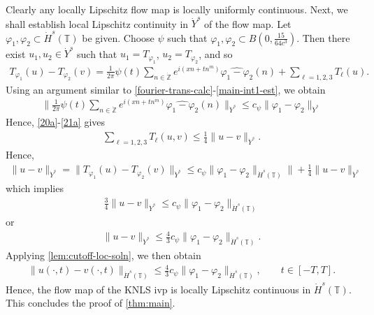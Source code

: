 \documentclass[12pt,reqno]{amsart}
\numberwithin{equation}{section}  %
\numberwithin{figure}{section}
\newcommand{\zz}{\mathbb{Z}}
\newcommand{\ci}{\mathbb{T}}
\newcommand{\zzdot}{\dot{\zz}}
\newcommand{\wh}{\widehat}
\newcommand{\vp}{\varphi}
\theoremstyle{plain}
\theoremstyle{definition}
\theoremstyle{remark}
\begin{document}
%
%
Clearly any locally Lipschitz flow map is locally uniformly continuous. 
Next, we shall establish local Lipschitz continuity in $\dot{Y}^s$ of the flow
map. Let $\vp_1, \vp_2 \subset \dot{H}^s(\ci)$ be given. Choose $\psi$ such that
$\vp_1, \vp_2 \subset B(0, \frac{15}{64c^{3}})$.  Then there exist $u_1, u_2 \in
\dot{Y}^s$ such that $u_1 = T_{\vp_1}$, $u_2 = T_{\vp_2}$, and so
%
%
\begin{equation*}
	\begin{split}
		T_{\vp_1}(u) - T_{\vp_2}(v) = \frac{1}{2\pi} \psi(t) \sum_{n \in
		\zzdot}e^{i\left( xn + tn^{m} \right)} \wh{\vp_1 - \vp_2}(n) + \sum_{\ell
		= 1,2,3} T_{\ell}(u).
	\end{split}
\end{equation*}
%
%
Using an argument similar to \eqref{fourier-trans-calc}-\eqref{main-int1-est},
we obtain
%
%
\begin{equation*}
	\begin{split}
		\| \frac{1}{2\pi} \psi(t) \sum_{n \in
		\zzdot}e^{i\left( xn + tn^{m} \right)} \wh{\vp_1 - \vp_2}(n)\|_{\dot{Y}^s}
		\le c_\psi \|\vp_{1} - \vp_{2}\|_{\dot{Y}^s} 
	\end{split}
\end{equation*}
%
%
Hence, \eqref{20a}-\eqref{21a} gives
%
%
\begin{equation*}
	\begin{split}
		\sum_{\ell=1,2,3} T_{\ell}(u,v) \le \frac{1}{4}\|u-v\|_{\dot{Y}^s}.
	\end{split}
\end{equation*}
%
%
Hence,
%
%
\begin{equation*}
	\begin{split}
		\|u -v \|_{\dot{Y}^s} = \|T_{\vp_1}(u) - T_{\vp_2}(v) \|_{\dot{Y}^s} \le c_\psi
		\|\vp_{1} - \vp_{2} \|_{\dot{H}^s\left( \ci \right)}\| +
		\frac{1}{4} \|u -v \|_{\dot{Y}^s}
	\end{split}
\end{equation*}
%
%
which implies
%
%
\begin{equation*}
	\begin{split}
		\frac{3}{4} \|u-v\|_{\dot{Y}^s} \le c_\psi \|\vp_1 - \vp_2 \|_{\dot{H}^s(\ci)}
	\end{split}
\end{equation*}
%
%
or
%
%
\begin{equation*}
	\begin{split}
		\|u -v \|_{\dot{Y}^s} \le \frac{4}{3} c_\psi \|\vp_1 - \vp_2 \|_{\dot{H}^s(\ci)}.
	\end{split}
\end{equation*}
%
%
Applying \autoref{lem:cutoff-loc-soln}, we then obtain
%
%
	 \begin{equation*}
		 \begin{split}
			\|u(\cdot, t) -v(\cdot, t) \|_{\dot{H}^s(\ci)} \le \frac{4}{3} c_\psi \|\vp_1 -
			\vp_2 \|_{\dot{H}^s(\ci)}, \qquad t \in [-T, T].
		 \end{split}
	 \end{equation*}
Hence, the flow map of the KNLS ivp is locally Lipschitz continuous in
$\dot{H}^s(\ci)$. This
concludes the proof of \autoref{thm:main}. \qquad \qedsymbol
%
%
%
%
\end{document}
